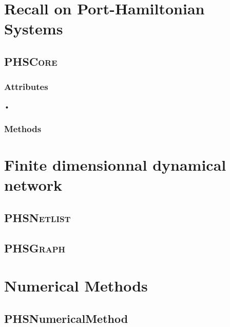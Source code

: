 \documentclass[10pt,a4paper]{article}
\begin{document}
{\section{Recall on Port-Hamiltonian Systems}
\subsection{\textsc{PHSCore}}
\subsubsection{Attributes}
\begin{description}
\item[•]
\end{description}
\subsubsection{Methods}


\section{Finite dimensionnal dynamical network}
\subsection{\textsc{PHSNetlist}}
\subsection{\textsc{PHSGraph}}

\section{Numerical Methods}
\subsection{PHSNumericalMethod}

}
\end{document}

